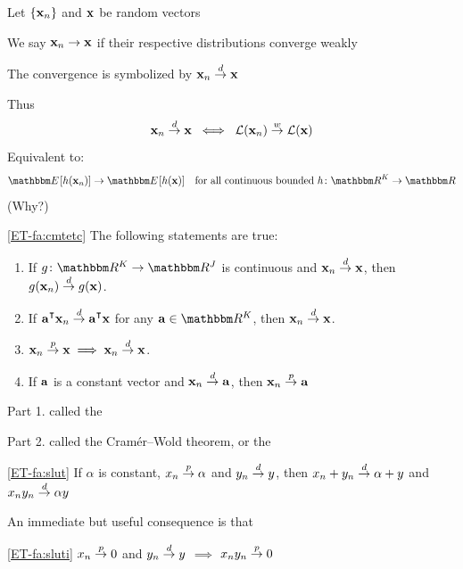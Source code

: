 \begin{frame}

    \vspace{2em}
    Let $\{{\mathbf x}_n\}$ and ${\mathbf x}$ be random vectors
    
    We say ${\mathbf x}_n \to {\mathbf x}$  if their respective distributions converge weakly
    
    The
    convergence is symbolized by ${\mathbf x}_n \stackrel { d } {\to} {\mathbf x}$
    
    Thus
    \begin{equation*}
        {\mathbf x}_n \stackrel { d } {\to} {\mathbf x}
        \; \iff \;
        \mathcal L({\mathbf x}_n) \stackrel { w } {\to} \mathcal L({\mathbf x})
    \end{equation*}
    Equivalent to:
    \begin{equation*}
        \EE[ h(\boldx_n)]  \to \EE[ h(\boldx) ]
        \quad 
        \text{for all continuous bounded $h \colon \RR^K \to \RR$}
    \end{equation*}
    (Why?)
    
\end{frame}

\begin{frame}

    \vspace{2em}
    \Fact\eqref{ET-fa:cmtetc}
    The following statements are true:
    \begin{enumerate}
        \item If $g \colon \RR^K \to \RR^J$ is continuous and
            ${\mathbf x}_n \stackrel { d } {\to} {\mathbf x}$, then $g({\mathbf x}_n) \stackrel { d } {\to} g({\mathbf x})$.
        \item If $\bolda^\T \boldx_n \tod \bolda^\T \boldx$ for any $\bolda \in \RR^K$,
            then ${\mathbf x}_n \stackrel { d } {\to} {\mathbf x}$.
        \item ${\mathbf x}_n \stackrel { p } {\to} {\mathbf x} \implies {\mathbf x}_n \stackrel { d } {\to} {\mathbf x}$.
        \item If ${\mathbf a}$ is a constant vector and ${\mathbf x}_n \stackrel { d } {\to} {\mathbf a}$,
            then ${\mathbf x}_n \stackrel { p } {\to} {\mathbf a}$
    \end{enumerate}
    
    Part 1. called the 
    
    Part 2.  called the 
    Cram\'er--Wold theorem, or the 
    
\end{frame}

\begin{frame}

    \vspace{2em}
    \Fact\eqref{ET-fa:slut}
        If $\alpha$ is constant, $x_n \stackrel { p } {\to} \alpha$ and $y_n \stackrel { d } {\to} y$, then
            $x_n + y_n \stackrel { d } {\to} \alpha + y$ and $x_n y_n \stackrel { d } {\to} \alpha y$
    
    \vspace{1em}
    An immediate but useful consequence is that 
    
    \Fact\eqref{ET-fa:sluti}
        $x_n \stackrel { p } {\to} 0$ and $y_n \stackrel { d } {\to} y$ $\implies$ $x_n y_n \stackrel { p } {\to} 0$

\end{frame}


